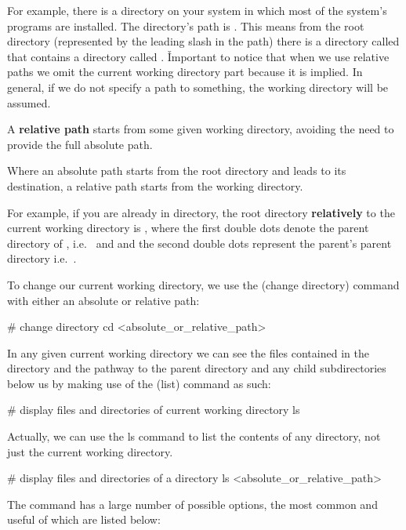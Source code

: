 \be
For example, there is a directory on your system in which most of the system's programs are installed. The directory's
path is . This means from the root directory (represented by the leading slash in the path) there is
a directory called  that contains a directory called . \v

Important to notice that when we use relative paths we omit the current working directory  part because it is
implied. In general, if we do not specify a path to something, the working directory will be assumed.
\ee

A \textbf{relative path} starts from some given working directory, avoiding the need to provide the full absolute path.
\ed

Where an absolute path starts from the root directory and leads to its destination, a relative path starts from the
working directory.

\be
For example, if you are already in  directory, the root directory \textbf{relatively} to the current
working directory  is , where the first double dots denote the parent directory of
, i.e.\  and and the second double dots represent the parent's parent directory i.e.\
\code{/}.
\ee

To change our current working directory, we use the  (change directory) command with either an absolute or
relative path:
\begin{bash}
# change directory
cd <absolute_or_relative_path>
\end{bash}

In any given current working directory we can see the files contained in the directory and the pathway
to the parent directory and any child subdirectories below us by making use of the \code{ls} (list) command as such:
\begin{bash}
# display files and directories of current working directory
ls
\end{bash}

Actually, we can use the ls command to list the contents of any directory, not just the current working directory.
\begin{bash}
# display files and directories of a directory
ls <absolute_or_relative_path>
\end{bash}

The  command has a large number of possible options, the most common and useful of which are listed below:

